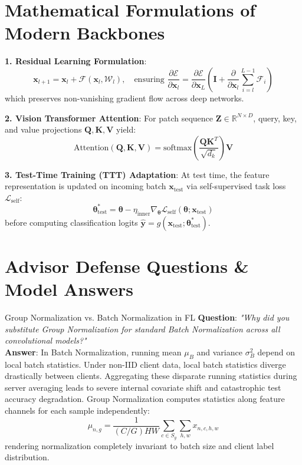 \documentclass[11pt,a4paper,titlepage]{report}
\begin{document}
\section{Mathematical Formulations of Modern Backbones}
\begin{mathfoundation}
\textbf{1. Residual Learning Formulation}:
\begin{equation}
    \mathbf{x}_{l+1} = \mathbf{x}_l + \mathcal{F}(\mathbf{x}_l, \mathcal{W}_l), \quad \text{ensuring } \frac{\partial \mathcal{E}}{\partial \mathbf{x}_l} = \frac{\partial \mathcal{E}}{\partial \mathbf{x}_L} \left( \mathbf{I} + \frac{\partial}{\partial \mathbf{x}_l} \sum_{i=l}^{L-1} \mathcal{F}_i \right)
\end{equation}
which preserves non-vanishing gradient flow across deep networks.

\textbf{2. Vision Transformer Attention}:
For patch sequence $\mathbf{Z} \in \mathbb{R}^{N \times D}$, query, key, and value projections $\mathbf{Q}, \mathbf{K}, \mathbf{V}$ yield:
\begin{equation}
    \text{Attention}(\mathbf{Q}, \mathbf{K}, \mathbf{V}) = \text{softmax}\left( \frac{\mathbf{Q} \mathbf{K}^T}{\sqrt{d_k}} \right) \mathbf{V}
\end{equation}

\textbf{3. Test-Time Training (TTT) Adaptation}:
At test time, the feature representation is updated on incoming batch $\mathbf{x}_{\text{test}}$ via self-supervised task loss $\mathcal{L}_{\text{self}}$:
\begin{equation}
    \bm{\theta}^*_{\text{test}} = \bm{\theta} - \eta_{\text{inner}} \nabla_{\bm{\theta}} \mathcal{L}_{\text{self}}(\bm{\theta}; \mathbf{x}_{\text{test}})
\end{equation}
before computing classification logits $\hat{\mathbf{y}} = g(\mathbf{x}_{\text{test}}; \bm{\theta}^*_{\text{test}})$.
\end{mathfoundation}

\section{Advisor Defense Questions \& Model Answers}
\begin{defenseqa}{Group Normalization vs. Batch Normalization in FL}
\textbf{Question}: \textit{"Why did you substitute Group Normalization for standard Batch Normalization across all convolutional models?"}\\
\textbf{Answer}: In Batch Normalization, running mean $\mu_B$ and variance $\sigma_B^2$ depend on local batch statistics. Under non-IID client data, local batch statistics diverge drastically between clients. Aggregating these disparate running statistics during server averaging leads to severe internal covariate shift and catastrophic test accuracy degradation. Group Normalization computes statistics along feature channels for each sample independently:
\begin{equation}
    \mu_{n, g} = \frac{1}{(C/G)HW} \sum_{c \in S_g} \sum_{h, w} x_{n, c, h, w}
\end{equation}
rendering normalization completely invariant to batch size and client label distribution.
\end{defenseqa}
\end{document}
